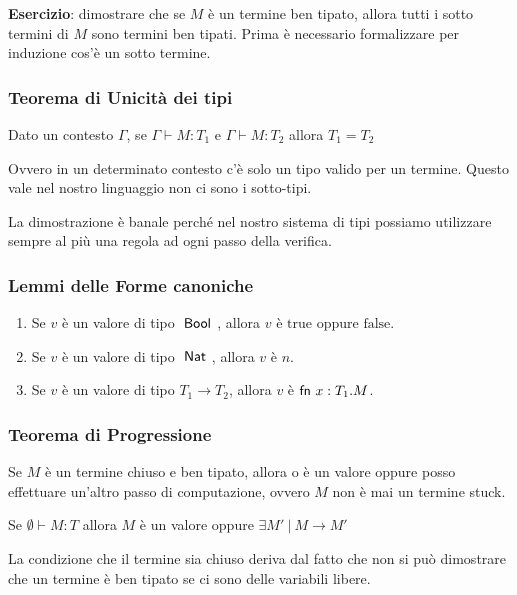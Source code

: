 \textbf{Esercizio}: dimostrare che se $M$ è un termine ben tipato, allora tutti i sotto termini di $M$ sono termini ben tipati. Prima è necessario formalizzare per induzione cos'è un sotto termine.

\subsubsection{Teorema di Unicità dei tipi}

\begin{center}
	Dato un contesto $\Gamma$, se $\Gamma \vdash M : T_1 $ e $\Gamma \vdash M : T_2$ allora $T_1 = T_2$
\end{center}

\noindent Ovvero in un determinato contesto c'è solo un tipo valido per un termine. Questo vale nel nostro linguaggio non ci sono i sotto-tipi. 

La dimostrazione è banale perché nel nostro sistema di tipi possiamo utilizzare sempre al più una regola ad ogni passo della verifica.


\subsubsection{Lemmi delle Forme canoniche}

\begin{enumerate}
	\item Se $v$ è un valore di tipo $\Bool$, allora $v$ è $\text{true}$ oppure $\text{false}$.
	\item Se $v$ è un valore di tipo $\Nat$, allora $v$ è $n$.
	\item Se $v$ è un valore di tipo $T_1 \rightarrow T_2$, allora $v$ è $\fn x : T_1 . M$.
\end{enumerate}

\subsubsection{Teorema di Progressione}

Se $M$ è un termine chiuso e ben tipato, allora o è un valore oppure posso effettuare un'altro passo di computazione, ovvero $M$ non è mai un termine stuck.

\begin{center}
Se $\emptyset \vdash M : T$ allora $M$ è un valore oppure $\exists M' \: | \: M \rightarrow M'$
\end{center}

\noindent La condizione che il termine sia chiuso deriva dal fatto che non si può dimostrare che un termine è ben tipato se ci sono delle variabili libere.

